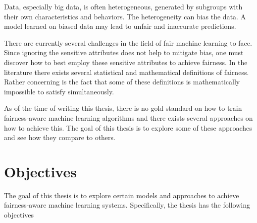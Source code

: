 Data, especially big data, is often heterogeneous, generated by subgroups with their own characteristics and behaviors. The heterogeneity can bias the data. A model learned on biased data may lead to unfair and inaccurate predictions.

There are currently several challenges in the field of fair machine learning to face. Since ignoring the sensitive attributes does not help to mitigate bias, one must discover how to best employ these sensitive attributes to achieve fairness. In the literature there exists several statistical and mathematical definitions of fairness. Rather concerning is the fact that some of these definitions is mathematically impossible to satisfy simultaneously. \cite{kleinberg2016inherent}

As of the time of writing this thesis, there is no gold standard on how to train fairness-aware machine learning algorithms and there exists several approaches on how to achieve this. \cite{mehrabi2021survey} The goal of this thesis is to explore some of these approaches and see how they compare to others. 


\section{Objectives}
\label{sec:intro:objectives}

The goal of this thesis is to explore certain models and approaches to achieve fairness-aware machine learning systems. Specifically, the thesis has the following objectives

